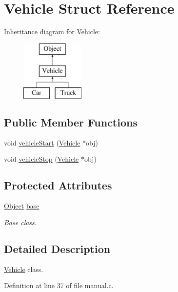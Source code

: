 \hypertarget{struct_vehicle}{}\section{Vehicle Struct Reference}
\label{struct_vehicle}
Inheritance diagram for Vehicle\+:\begin{figure}[H]
\begin{center}
\leavevmode
\includegraphics[height=3.000000cm]{struct_vehicle}
\end{center}
\end{figure}
\subsection*{Public Member Functions}
\begin{DoxyCompactItemize}
\item 
void \hyperlink{struct_vehicle_a6891d3d28853bc3fdd075596dc6de9f8}{vehicle\+Start} (\hyperlink{struct_vehicle}{Vehicle} $\ast$obj)
\item 
void \hyperlink{struct_vehicle_a4dcbcba43792dcd673a552b14479ab77}{vehicle\+Stop} (\hyperlink{struct_vehicle}{Vehicle} $\ast$obj)
\end{DoxyCompactItemize}
\subsection*{Protected Attributes}
\begin{DoxyCompactItemize}
\item 
\hyperlink{struct_object}{Object} \hyperlink{struct_vehicle_a23cf4ef56ba22bed625eab08d6361fa7}{base}
\begin{DoxyCompactList}\small\item\em Base class. \end{DoxyCompactList}\end{DoxyCompactItemize}


\subsection{Detailed Description}
\hyperlink{struct_vehicle}{Vehicle} class. 

Definition at line 37 of file manual.\+c.



